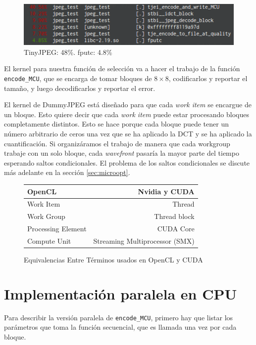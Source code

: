 \begin{figure}[ht]
    \includegraphics[width=4.5625in]{fputc}
    \caption{TinyJPEG: 48\%. fputc: 4.8\%}
\end{figure}

El kernel para nuestra función de selección va a hacer el trabajo de la función
\verb+encode_MCU+, que se encarga de tomar bloques de $8\times8$, codificarlos
y reportar el tamaño, y luego decodificarlos y reportar el error.

El kernel de DummyJPEG está diseñado para que cada \emph{work item} se encargue de un
bloque. Esto quiere decir que cada \emph{work item} puede estar procesando bloques
completamente distintos. Esto se hace porque cada bloque puede tener un número
arbitrario de ceros una vez que se ha aplicado la \gls{DCT} y se ha aplicado la
cuantificación. Si organizáramos el trabajo de manera que cada workgroup trabaje
con un solo bloque, cada \emph{wavefront} pasaría la mayor parte del tiempo esperando saltos
condicionales. El problema de los saltos condicionales se discute más adelante
en la sección \ref{sec:microopt}.

\begin {figure}
    \begin{tabular}{ | l | r | }
    \hline
    OpenCL             & Nvidia y CUDA \\
    \hline
    Work Item          & Thread \\
    Work Group         & Thread block \\
    Processing Element & CUDA Core \\
    Compute Unit       & Streaming Multiprocessor (SMX) \\
    \hline
    \end{tabular}
    \caption{Equivalencias Entre Términos usados en OpenCL y CUDA}
    \label{table:equiv}
\end{figure}

\section{Implementación paralela en CPU}

Para describir la versión paralela de \verb+encode_MCU+, primero hay que listar
los parámetros que toma la función secuencial, que es llamada una vez por cada
bloque.


